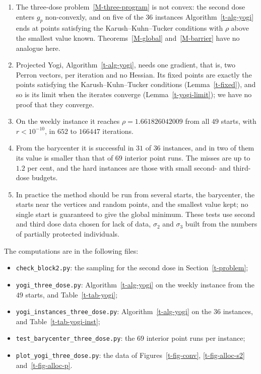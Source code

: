 \documentclass[11pt]{article}
\theoremstyle{plain}
\theoremstyle{remark}
\numberwithin{equation}{section}
\begin{document}
\begin{enumerate}
\item The three-dose problem~\eqref{M-three-program} is not convex: the
second dose enters $g_p$ non-convexly, and on five of the $36$ instances
Algorithm~\ref{t-alg-yogi} ends at points satisfying the
Karush--Kuhn--Tucker conditions with $\rho$ above the smallest value known.
Theorems~\ref{M-global} and~\ref{M-barrier} have no analogue here.
\item Projected Yogi, Algorithm~\ref{t-alg-yogi}, needs one gradient, that is,
two Perron vectors, per iteration and no Hessian. Its fixed points are exactly
the points satisfying the Karush--Kuhn--Tucker conditions
(Lemma~\ref{t-fixed}), and so is its limit when the iterates converge
(Lemma~\ref{t-yogi-limit}); we have no proof that they converge.
\item On the weekly instance it reaches $\rho=1.661826042009$ from all $49$
starts, with $r<10^{-10}$, in $652$ to $166447$ iterations.
\item From the barycenter it is successful in $31$ of $36$ instances, and in
two of them its value is smaller than that of $69$ interior point runs. The
misses are up to $1.2$ per cent, and the hard instances are those with small
second- and third-dose budgets.
\item In practice the method should be run from several starts, the
barycenter, the starts near the vertices and random points, and the smallest
value kept; no single start is guaranteed to give the global minimum. These
tests use second and third dose data chosen for lack of data, $\sigma_2$ and
$\sigma_3$ built from the numbers of partially protected individuals.
\end{enumerate}

The computations are in the following files:
\begin{itemize}
\item \texttt{check\_block2.py}: the sampling for the second dose in
Section~\ref{t-problem};
\item \texttt{yogi\_three\_dose.py}: Algorithm~\ref{t-alg-yogi} on the weekly
instance from the $49$ starts, and Table~\ref{t-tab-yogi};
\item \texttt{yogi\_instances\_three\_dose.py}: Algorithm~\ref{t-alg-yogi} on
the $36$ instances, and Table~\ref{t-tab-yogi-inst};
\item \texttt{test\_barycenter\_three\_dose.py}: the $69$ interior point runs
per instance;
\item \texttt{plot\_yogi\_three\_dose.py}: the data of
Figures~\ref{t-fig-conv}, \ref{t-fig-alloc-s2} and~\ref{t-fig-alloc-p}.
\end{itemize}



\end{document}
